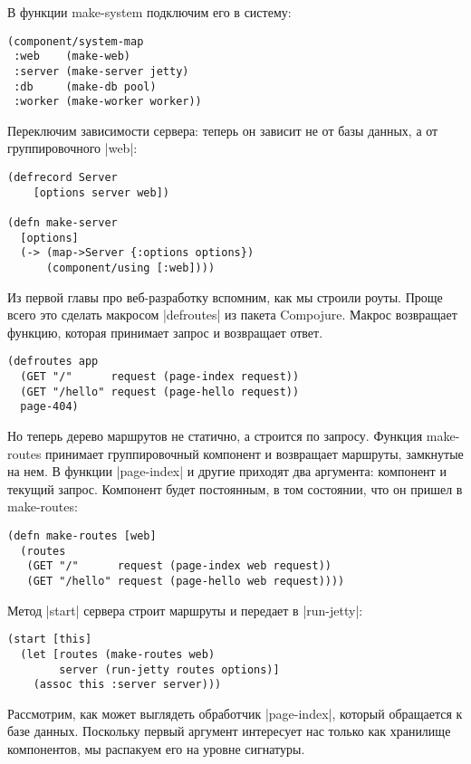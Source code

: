 В функции make-system подключим его в систему:

\begin{verbatim}
(component/system-map
 :web    (make-web)
 :server (make-server jetty)
 :db     (make-db pool)
 :worker (make-worker worker))
\end{verbatim}

Переключим зависимости сервера: теперь он зависит не от базы данных, а от
группировочного \spverb|web|:

\begin{verbatim}
(defrecord Server
    [options server web])

(defn make-server
  [options]
  (-> (map->Server {:options options})
      (component/using [:web])))
\end{verbatim}

Из первой главы про веб-разработку вспомним, как мы строили роуты. Проще всего
это сделать макросом \spverb|defroutes| из пакета Compojure. Макрос возвращает функцию,
которая принимает запрос и возвращает ответ.

\begin{verbatim}
(defroutes app
  (GET "/"      request (page-index request))
  (GET "/hello" request (page-hello request))
  page-404)
\end{verbatim}

Но теперь дерево маршрутов не статично, а строится по запросу. Функция
make-routes принимает группировочный компонент и возвращает маршруты, замкнутые
на нем. В функции \spverb|page-index| и другие приходят два аргумента: компонент и
текущий запрос. Компонент будет постоянным, в том состоянии, что он пришел в
make-routes:

\begin{verbatim}
(defn make-routes [web]
  (routes
   (GET "/"      request (page-index web request))
   (GET "/hello" request (page-hello web request))))
\end{verbatim}

Метод \spverb|start| сервера строит маршруты и передает в \spverb|run-jetty|:

\begin{verbatim}
(start [this]
  (let [routes (make-routes web)
        server (run-jetty routes options)]
    (assoc this :server server)))
\end{verbatim}

Рассмотрим, как может выглядеть обработчик \spverb|page-index|, который обращается к
базе данных. Поскольку первый аргумент интересует нас только как хранилище
компонентов, мы распакуем его на уровне сигнатуры.

